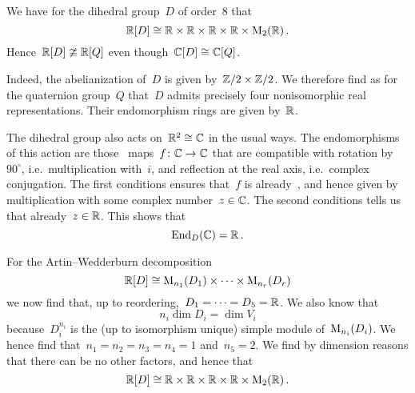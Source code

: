 \begin{remark}
  We have for the dihedral group~$D$ of order~$8$ that
  \[
    \mathbb{R}[D]
    \cong
    \mathbb{R} \times \mathbb{R} \times \mathbb{R} \times \mathbb{R} \times \operatorname{M}_{2}(\mathbb{R})  \,.
  \]
  Hence~$\mathbb{R}[D] \ncong \mathbb{R}[Q]$ even though~$\mathbb{C}[D] \cong \mathbb{C}[Q]$.
  
  Indeed, the abelianization of~$D$ is given by~$\mathbb{Z}/2 \times \mathbb{Z}/2$.
  We therefore find as for the quaternion group~$Q$ that~$D$ admits precisely four nonisomorphic real  representations.
  Their endomorphism rings are given by~$\mathbb{R}$.
  
  The dihedral group also acts on~$\mathbb{R}^2 \cong \mathbb{C}$ in the usual ways.
  The endomorphisms of this action are those~ maps~$f \colon \mathbb{C} \to \mathbb{C}$ that are compatible with rotation by~$90^\circ$, i.e.\ multiplication with~$i$, and reflection at the real axis, i.e.\ complex conjugation.
  The first conditions ensures that~$f$ is already~, and hence given by multiplication with some complex number~$z \in \mathbb{C}$.
  The second conditions tells us that already~$z \in \mathbb{R}$.
  This shows that
  \[
    \operatorname{End}_{D}(\mathbb{C})
    =
    \mathbb{R} \,.
  \]
  
  For the Artin--Wedderburn decomposition
  \[
    \mathbb{R}[D]
    \cong
    \operatorname{M}_{n_1}(D_1) \times \dotsb \times \operatorname{M}_{n_r}(D_r)
  \]
  we now find that, up to reordering,~$D_1 = \dotsb = D_5 = \mathbb{R}$.
  We also know  that
  \[
    n_i \dim D_i
    =
    \dim V_i
  \]
  because~$D_i^{n_i}$ is the (up to isomorphism unique) simple module of~$\operatorname{M}_{n_i}(D_i)$.
  We hence find that~$n_1 = n_2 = n_3 = n_4 = 1$ and~$n_5 = 2$.
  We find by dimension reasons that there can be no other factors, and hence that
  \[
    \mathbb{R}[D]
    \cong
    \mathbb{R} \times \mathbb{R} \times \mathbb{R} \times \mathbb{R} \times \operatorname{M}_{2}(\mathbb{R})  \,.
  \]
\end{remark}






















